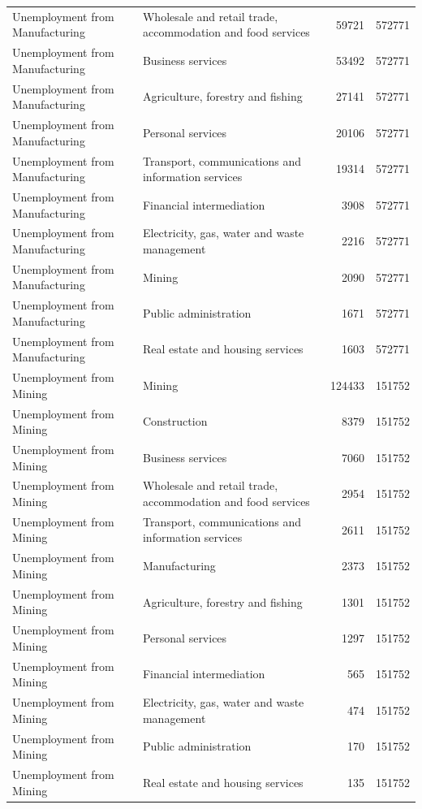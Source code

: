 \begin{longtable}{llrr}
Unemployment from Manufacturing & Wholesale and retail trade, accommodation and food services & 59721 & 572771 \\
Unemployment from Manufacturing & Business services & 53492 & 572771 \\
Unemployment from Manufacturing & Agriculture, forestry and fishing & 27141 & 572771 \\
Unemployment from Manufacturing & Personal services & 20106 & 572771 \\
Unemployment from Manufacturing & Transport, communications and information services & 19314 & 572771 \\
Unemployment from Manufacturing & Financial intermediation & 3908 & 572771 \\
Unemployment from Manufacturing & Electricity, gas, water and waste management & 2216 & 572771 \\
Unemployment from Manufacturing & Mining & 2090 & 572771 \\
Unemployment from Manufacturing & Public administration & 1671 & 572771 \\
Unemployment from Manufacturing & Real estate and housing services & 1603 & 572771 \\
Unemployment from Mining & Mining & 124433 & 151752 \\
Unemployment from Mining & Construction & 8379 & 151752 \\
Unemployment from Mining & Business services & 7060 & 151752 \\
Unemployment from Mining & Wholesale and retail trade, accommodation and food services & 2954 & 151752 \\
Unemployment from Mining & Transport, communications and information services & 2611 & 151752 \\
Unemployment from Mining & Manufacturing & 2373 & 151752 \\
Unemployment from Mining & Agriculture, forestry and fishing & 1301 & 151752 \\
Unemployment from Mining & Personal services & 1297 & 151752 \\
Unemployment from Mining & Financial intermediation & 565 & 151752 \\
Unemployment from Mining & Electricity, gas, water and waste management & 474 & 151752 \\
Unemployment from Mining & Public administration & 170 & 151752 \\
Unemployment from Mining & Real estate and housing services & 135 & 151752 \\

\end{longtable}
